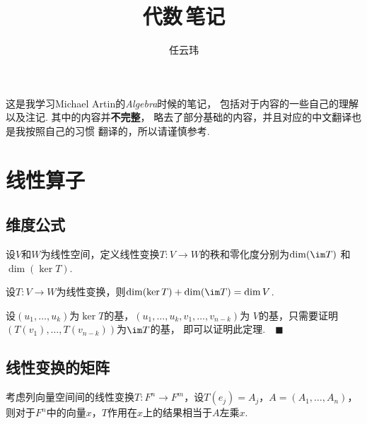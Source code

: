 

\title{代数$\,$笔记}
\author{任云玮}
\date{}



\maketitle
\tableofcontents
\newpage

  这是我学习Michael Artin的\textit{Algebra}时候的笔记，
  包括对于内容的一些自己的理解以及注记. 其中的内容并\textbf{不完整}，
  略去了部分基础的内容，并且对应的中文翻译也是我按照自己的习惯
  翻译的，所以请谨慎参考.



\newpage


\newpage


\newpage
\section{线性算子}

\subsection{维度公式}

  \begin{defi}
    设$V$和$W$为线性空间，定义线性变换$T:V\to W$的秩和零化度分别为$\dim(\im T)$
    和$\dim(\ker T)$.
  \end{defi}

  \begin{thm}[维度公式]
    设$T:V\to W$为线性变换，则$\dim(\ker T)+\dim(\im T)=\dim V$.
  \end{thm}
  \proof
    设$(u_1,\dots,u_k)$为$\ker T$的基，$(u_1,\dots,u_k, v_1,\dots,v_{n-k})$为
    $V$的基，只需要证明$(T(v_1),\dots, \allowbreak T(v_{n-k}))$为$\im T$的基，
    即可以证明此定理.$\quad\blacksquare$

  \begin{cor}

  \end{cor}

\subsection{线性变换的矩阵}
  \begin{lemma}
    考虑列向量空间间的线性变换$T:F^n\to F^m$，设$T(e_j)=A_j$，$A=(A_1,\dots,A_n)$，
    则对于$F^n$中的向量$x$，$T$作用在$x$上的结果相当于$A$左乘$x$.
  \end{lemma}

